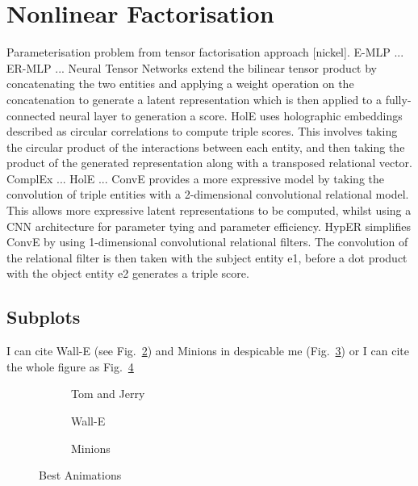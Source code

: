 \section{Nonlinear Factorisation}
Parameterisation problem from tensor factorisation approach [nickel]. \newline
E-MLP ... \newline
ER-MLP ... \newline
Neural Tensor Networks extend the bilinear tensor product by concatenating the two entities and applying a weight operation on the concatenation to generate a latent representation which is then applied to a fully-connected neural layer to generation a score. HolE uses holographic embeddings described as circular correlations to compute triple scores. This involves taking the circular product of the interactions between each entity, and then taking the product of the generated representation along with a transposed relational vector. \newline
ComplEx ... \newline
HolE ... \newline
ConvE provides a more expressive model by taking the convolution of triple entities with a 2-dimensional convolutional relational model. This allows more expressive latent representations to be computed, whilst using a CNN architecture for parameter tying and parameter efficiency. \newline
HypER simplifies ConvE by using 1-dimensional convolutional relational filters. The convolution of the relational filter is then taken with the subject entity e1, before a dot product with the object entity e2 generates a triple score. \newline


\begin{landscape}

\section*{Subplots}
I can cite Wall-E (see Fig.~\ref{fig:WallE}) and Minions in despicable me (Fig.~\ref{fig:Minnion}) or I can cite the whole figure as Fig.~\ref{fig:animations}


\begin{figure}
  \centering
  \begin{subfigure}[b]{0.3\textwidth}
    \caption{Tom and Jerry}
    \label{fig:TomJerry}   
  \end{subfigure}             
  \begin{subfigure}[b]{0.3\textwidth}
    \caption{Wall-E}
    \label{fig:WallE}
  \end{subfigure}             
  \begin{subfigure}[b]{0.3\textwidth}
    \caption{Minions}
    \label{fig:Minnion}
  \end{subfigure}
  \caption{Best Animations}
  \label{fig:animations}
\end{figure}


\end{landscape}
